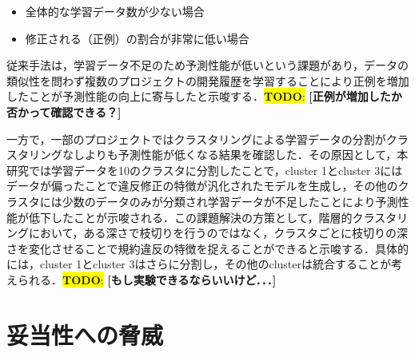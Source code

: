 \documentclass[T,J]{fose} %
\newcommand{\todo}[1]{\colorbox{yellow}{{\bf TODO}:}{\color{red} {\textbf{[#1]}}}}
\begin{document}
\begin{itemize}
    \item 全体的な学習データ数が少ない場合
    \item 修正される（正例）の割合が非常に低い場合
\end{itemize}

従来手法は，学習データ不足のため予測性能が低いという課題があり，データの類似性を問わず複数のプロジェクトの開発履歴を学習することにより正例を増加したことが予測性能の向上に寄与したと示唆する．\todo{正例が増加したか否かって確認できる？}

一方で，一部のプロジェクトではクラスタリングによる学習データの分割がクラスタリングなしよりも予測性能が低くなる結果を確認した．その原因として，本研究では学習データを10のクラスタに分割したことで，cluster 1とcluster 3にはデータが偏ったことで違反修正の特徴が汎化されたモデルを生成し，その他のクラスタには少数のデータのみが分類され学習データが不足したことにより予測性能が低下したことが示唆される．この課題解決の方策として，階層的クラスタリングにおいて，ある深さで枝切りを行うのではなく，クラスタごとに枝切りの深さを変化させることで規約違反の特徴を捉えることができると示唆する．具体的には，cluster 1とcluster 3はさらに分割し，その他のclusterは統合することが考えられる．\todo{もし実験できるならいいけど．．．}







\section{妥当性への脅威}\label{sec:heuristic}
\end{document}
